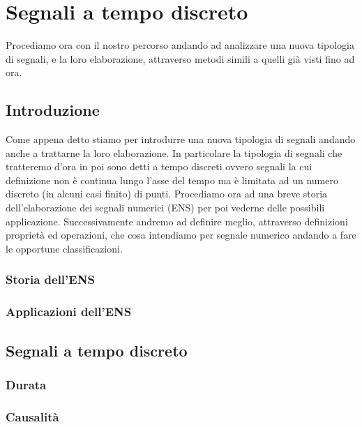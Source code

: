 \documentclass[../main.tex]{subfiles}
\begin{document}

\clearpage
\thispagestyle{empty}
\vspace*{7cm}
\section{Segnali a tempo discreto}
\vspace*{1.5cm}

Procediamo ora con il nostro percorso andando ad analizzare una nuova tipologia di segnali, e la loro elaborazione, attraverso metodi simili a quelli già visti fino ad ora.

\subsection{Introduzione}

Come appena detto stiamo per introdurre una nuova tipologia di segnali andando anche a trattarne la loro elaborazione.
In particolare la tipologia di segnali che tratteremo d'ora in poi sono detti a tempo discreti ovvero segnali la cui definizione non è continua lungo l'asse del tempo ma è limitata ad un numero discreto (in alcuni casi finito) di punti.
Procediamo ora ad una breve storia dell'elaborazione dei segnali numerici (ENS) per poi vederne delle possibili applicazione. Successivamente andremo ad definire meglio, attraverso definizioni proprietà ed operazioni, che cosa intendiamo per segnale numerico andando a fare le opportune classificazioni.

\subsubsection{Storia dell'ENS}

\subsubsection{Applicazioni dell'ENS}

\subsection{Segnali a tempo discreto}

\subsubsection{Durata}
\subsubsection{Causalità}
\end{document}
